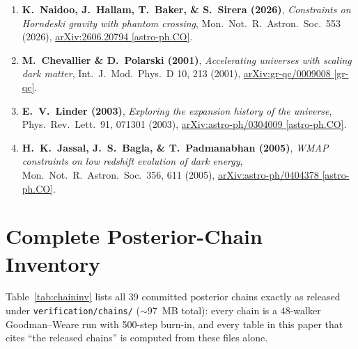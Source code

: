 \documentclass[aps,prd,preprint,superscriptaddress,nofootinbib]{revtex4-2}
\begin{document}
\begin{enumerate}
    \item \textbf{K.\ Naidoo, J.\ Hallam, T.\ Baker, \& S.\ Sirera (2026)}, \emph{Constraints on Horndeski gravity with phantom crossing}, Mon.\ Not.\ R.\ Astron.\ Soc.\ 553 (2026), \href{https://arxiv.org/abs/2606.20794}{arXiv:2606.20794 [astro-ph.CO]}.
    \item \textbf{M.\ Chevallier \& D.\ Polarski (2001)}, \emph{Accelerating universes with scaling dark matter}, Int.\ J.\ Mod.\ Phys.\ D 10, 213 (2001), \href{https://arxiv.org/abs/gr-qc/0009008}{arXiv:gr-qc/0009008 [gr-qc]}.
    \item \textbf{E.\ V.\ Linder (2003)}, \emph{Exploring the expansion history of the universe}, Phys.\ Rev.\ Lett.\ 91, 071301 (2003), \href{https://arxiv.org/abs/astro-ph/0304009}{arXiv:astro-ph/0304009 [astro-ph.CO]}.
    \item \textbf{H.\ K.\ Jassal, J.\ S.\ Bagla, \& T.\ Padmanabhan (2005)}, \emph{WMAP constraints on low redshift evolution of dark energy}, Mon.\ Not.\ R.\ Astron.\ Soc.\ 356, 611 (2005), \href{https://arxiv.org/abs/astro-ph/0404378}{arXiv:astro-ph/0404378 [astro-ph.CO]}.
\end{enumerate}



\section{Complete Posterior-Chain Inventory}
\label{app:chains}

Table~\ref{tab:chaininv} lists all 39 committed posterior chains exactly as released under \texttt{verification/\allowbreak chains/} ($\sim$97~MB total): every chain is a 48-walker Goodman--Weare run with 500-step burn-in, and every table in this paper that cites ``the released chains'' is computed from these files alone.
\end{document}
